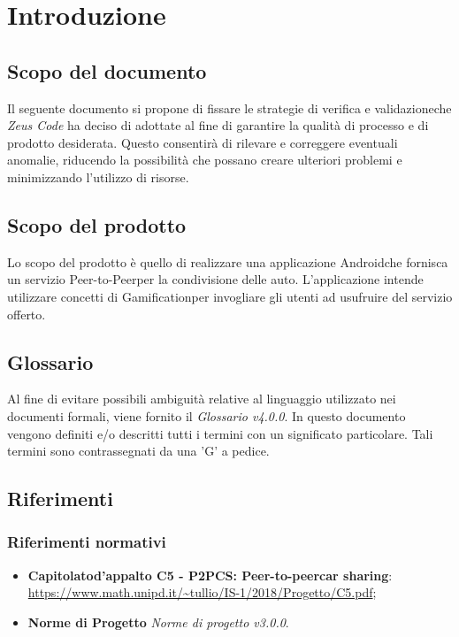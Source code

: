 \section{Introduzione}
\subsection{Scopo del documento}
Il seguente documento si propone di fissare le strategie di verifica e validazione\glosp che \textit{Zeus Code} ha deciso di adottate al fine di garantire la qualità di processo e di prodotto desiderata. \newline
Questo consentirà di rilevare e correggere eventuali anomalie, riducendo la possibilità che possano creare ulteriori problemi e minimizzando l'utilizzo di risorse. 
\subsection{Scopo del prodotto}
Lo scopo del prodotto è quello di realizzare una applicazione Android\glosp che fornisca un servizio Peer-to-Peer\glosp per la condivisione delle auto. L'applicazione intende utilizzare concetti di Gamification\glosp per invogliare gli utenti ad usufruire del servizio offerto.
\subsection{Glossario}
Al fine di evitare possibili ambiguità relative al linguaggio utilizzato nei documenti formali, viene fornito il \textit{Glossario v4.0.0}. In questo documento vengono definiti e/o descritti tutti i termini con un significato particolare. Tali termini sono contrassegnati da una 'G' a pedice.
\subsection{Riferimenti}
\subsubsection{Riferimenti normativi}
\begin{itemize}

\item \textbf{Capitolato\glosp d'appalto C5 - P2PCS: Peer-to-peer\glosp car sharing}: \\ \url{https://www.math.unipd.it/~tullio/IS-1/2018/Progetto/C5.pdf};
\item \textbf{Norme di Progetto} \textit{Norme di progetto v3.0.0}.
\end{itemize}
